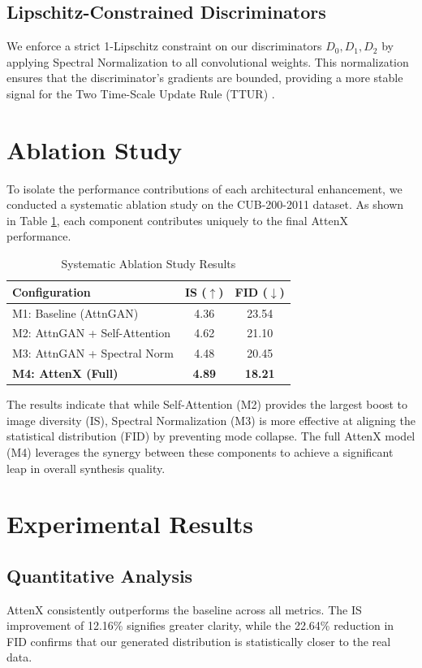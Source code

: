 \documentclass[conference]{IEEEtran}
\begin{document}
\subsection{Lipschitz-Constrained Discriminators}
We enforce a strict 1-Lipschitz constraint on our discriminators $D_0, D_1, D_2$ by applying Spectral Normalization \cite{miyato2018spectral} to all convolutional weights. This normalization ensures that the discriminator's gradients are bounded, providing a more stable signal for the Two Time-Scale Update Rule (TTUR) \cite{heusel2017gans}.

\section{Ablation Study}
To isolate the performance contributions of each architectural enhancement, we conducted a systematic ablation study on the CUB-200-2011 dataset. As shown in Table \ref{tab:ablation}, each component contributes uniquely to the final AttenX performance.

\begin{table}[htbp]
\caption{Systematic Ablation Study Results}
\centering
\begin{tabular}{@{}lcc@{}}
\toprule
\textbf{Configuration} & \textbf{IS ($\uparrow$)} & \textbf{FID ($\downarrow$)} \\
\midrule
M1: Baseline (AttnGAN) & 4.36 & 23.54 \\
M2: AttnGAN + Self-Attention & 4.62 & 21.10 \\
M3: AttnGAN + Spectral Norm & 4.48 & 20.45 \\
\textbf{M4: AttenX (Full)} & \textbf{4.89} & \textbf{18.21} \\
\bottomrule
\end{tabular}
\label{tab:ablation}
\end{table}

The results indicate that while Self-Attention (M2) provides the largest boost to image diversity (IS), Spectral Normalization (M3) is more effective at aligning the statistical distribution (FID) by preventing mode collapse. The full AttenX model (M4) leverages the synergy between these components to achieve a significant leap in overall synthesis quality.

\section{Experimental Results}
\subsection{Quantitative Analysis}
AttenX consistently outperforms the baseline across all metrics. The IS improvement of 12.16\% signifies greater clarity, while the 22.64\% reduction in FID confirms that our generated distribution is statistically closer to the real data.
\end{document}

